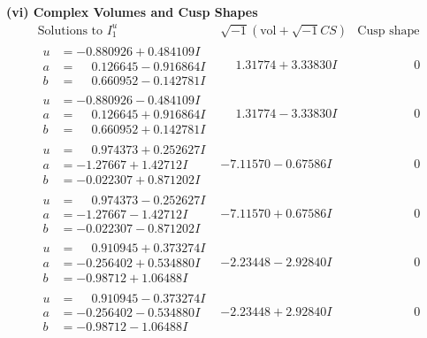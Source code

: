\documentclass[1p]{elsarticle_modified}
\theoremstyle{definition}
\newcommand{\I}{\sqrt{-1}}
\begin{document}
\newpage\flushleft \textbf{(vi) Complex Volumes and Cusp Shapes}
$$\begin{array}{c|c|c}  
\text{Solutions to }I^u_{1}& \I (\text{vol} + \sqrt{-1}CS) & \text{Cusp shape}\\
 \hline 
\begin{aligned}
u &= -0.880926 + 0.484109 I \\
a &= \phantom{-}0.126645 - 0.916864 I \\
b &= \phantom{-}0.660952 - 0.142781 I\end{aligned}
 & \phantom{-}1.31774 + 3.33830 I & \phantom{-0.000000 } 0 \\ \hline\begin{aligned}
u &= -0.880926 - 0.484109 I \\
a &= \phantom{-}0.126645 + 0.916864 I \\
b &= \phantom{-}0.660952 + 0.142781 I\end{aligned}
 & \phantom{-}1.31774 - 3.33830 I & \phantom{-0.000000 } 0 \\ \hline\begin{aligned}
u &= \phantom{-}0.974373 + 0.252627 I \\
a &= -1.27667 + 1.42712 I \\
b &= -0.022307 + 0.871202 I\end{aligned}
 & -7.11570 - 0.67586 I & \phantom{-0.000000 } 0 \\ \hline\begin{aligned}
u &= \phantom{-}0.974373 - 0.252627 I \\
a &= -1.27667 - 1.42712 I \\
b &= -0.022307 - 0.871202 I\end{aligned}
 & -7.11570 + 0.67586 I & \phantom{-0.000000 } 0 \\ \hline\begin{aligned}
u &= \phantom{-}0.910945 + 0.373274 I \\
a &= -0.256402 + 0.534880 I \\
b &= -0.98712 + 1.06488 I\end{aligned}
 & -2.23448 - 2.92840 I & \phantom{-0.000000 } 0 \\ \hline\begin{aligned}
u &= \phantom{-}0.910945 - 0.373274 I \\
a &= -0.256402 - 0.534880 I \\
b &= -0.98712 - 1.06488 I\end{aligned}
 & -2.23448 + 2.92840 I & \phantom{-0.000000 } 0 \\ \hline\begin{aligned}

\end{aligned}
\end{array}$$
\end{document}
